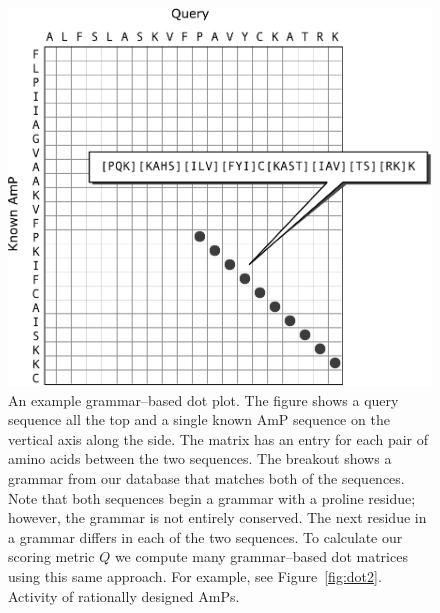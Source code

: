         \begin{figure}[ptb]
        \centering
        \includegraphics{Body/Images-chap2/dot.pdf}
        \caption[Example grammar--based dot plot]{
            An example grammar--based dot plot.  The
            figure shows a query sequence all the top and a single
            known AmP sequence on the vertical axis along the side.
            The matrix has an entry for each pair of amino acids
            between the two sequences.  The breakout shows a grammar
            from our database that matches both of the sequences.
            Note that both sequences begin a grammar with a proline
            residue; however, the grammar is not entirely conserved.
             The next residue in a grammar differs in each of the
             two sequences.  To calculate our scoring metric $Q$ we
             compute many grammar--based dot matrices using this same
             approach.  For example, see Figure~\vref{fig:dot2}.
            Activity of rationally designed AmPs.
        }
        \label{fig:dot}
        \end{figure}


